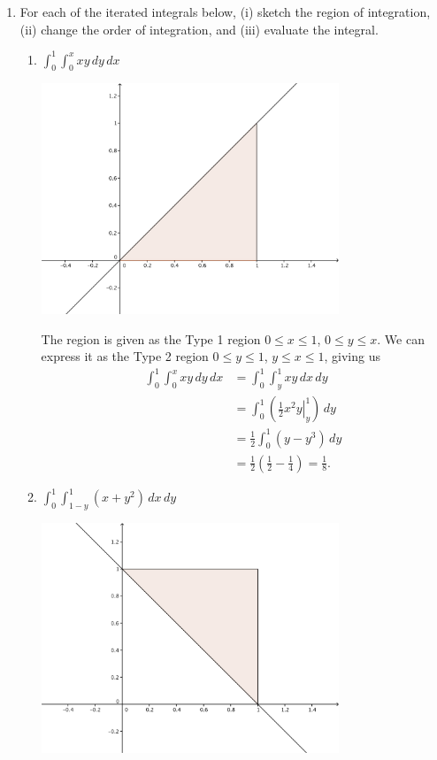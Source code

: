 \documentclass[letterpaper,12pt]{article}
\newcommand{\di}{\displaystyle}
\begin{document}
\begin{enumerate}
\begin{enumerate}
\end{enumerate}
 \item For each of the iterated integrals below, (i) sketch the region of integration, (ii) change the order of integration, and (iii) evaluate the integral.

 \begin{enumerate}
  \item $\di \int_0^1\int_0^x xy\,dy\,dx$

\begin{center}
\includegraphics[width=3.5in]{Q11-4a.png} 
\end{center}

The region is given as the Type 1 region $0\leq x\leq 1$, $0\leq y\leq x$. We can express it as the Type 2 region $0\leq y\leq 1$, $y\leq x\leq 1$, giving us
\begin{align*}
 \int_0^1\int_0^x xy\,dy\,dx & = \int_0^1 \int_y^1 xy\,dx\,dy\\
& = \int_0^1\left(\left.\frac{1}{2}x^2y\right|_y^1\right)\,dy\\
& = \frac{1}{2}\int_0^1(y-y^3)\,dy\\
& = \frac{1}{2}\left(\frac{1}{2}-\frac{1}{4}\right) = \frac{1}{8}.
\end{align*}

  \item $\di \int_0^1\int_{1-y}^1(x+y^2)\,dx\,dy$

\begin{center}
\includegraphics[width=3.5in]{Q11-4b.png} 
\end{center}


\end{enumerate}
\end{enumerate}
\end{document}
